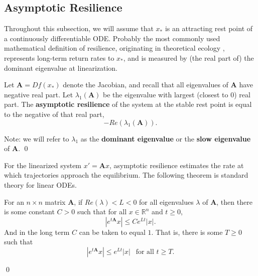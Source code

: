 \subsection{Asymptotic Resilience}
\label{sec:asymp_res}

Throughout this subsection, we will assume that $x_\ast$ is an attracting rest point of a continuously differentiable ODE. Probably the most commonly used mathematical definition of resilience,  originating in theoretical ecology \cite{pimmComplexityStabilityEcosystems1984, mayStabilityComplexityModel1974, hollingResilienceStabilityEcological1973, pimm1991balance}, represents long-term return rates to $x_{\ast}$, and is measured by (the real part of) the dominant eigenvalue at linearization. 

\begin{definition}
	\label{def:asymp}
	 Let $\textbf{A} = Df(x_\ast)$ denote the Jacobian, and recall that all eigenvalues of $\mathbf{A}$ have negative real part. Let $\lambda_1(\textbf{A})$ be the eigenvalue with largest (closest to 0) real part. 	The \textbf{asymptotic resilience} of the system at the stable rest point is equal to the negative of that real part, $$-Re(\lambda_1(\textbf{A})).$$

Note: we will refer to $\lambda_1$ as the \textbf{dominant eigenvalue} or the \textbf{slow eigenvalue} of $\mathbf{A}$. 
	 \qed 
\end{definition}

For the linearized system $x'= \textbf{A}x$, asymptotic resilience estimates the rate at which trajectories approach the equilibrium. The following theorem is standard theory for linear ODEs. %


\begin{theorem}
	For an $n \times n$ matrix $\mathbf{A}$, if $Re(\lambda) < L < 0$ for all eigenvalues $\lambda$ of $\mathbf{A}$, then there is some constant $C>0$ such that for all $x \in \mathbb{R}^n$ and $t \geq 0$,
	$$|e^{t\mathbf{A}}x| \leq Ce^{L t}|x|.$$ 
	And in the long term $C$ can be taken to equal $1$. That is, there is some $T \geq 0$ such that
	$$|e^{t\mathbf{A}}x| \leq e^{L t}|x| ~ ~\text{ for all } t \geq T.$$
	
	
	 \qed
\end{theorem}


